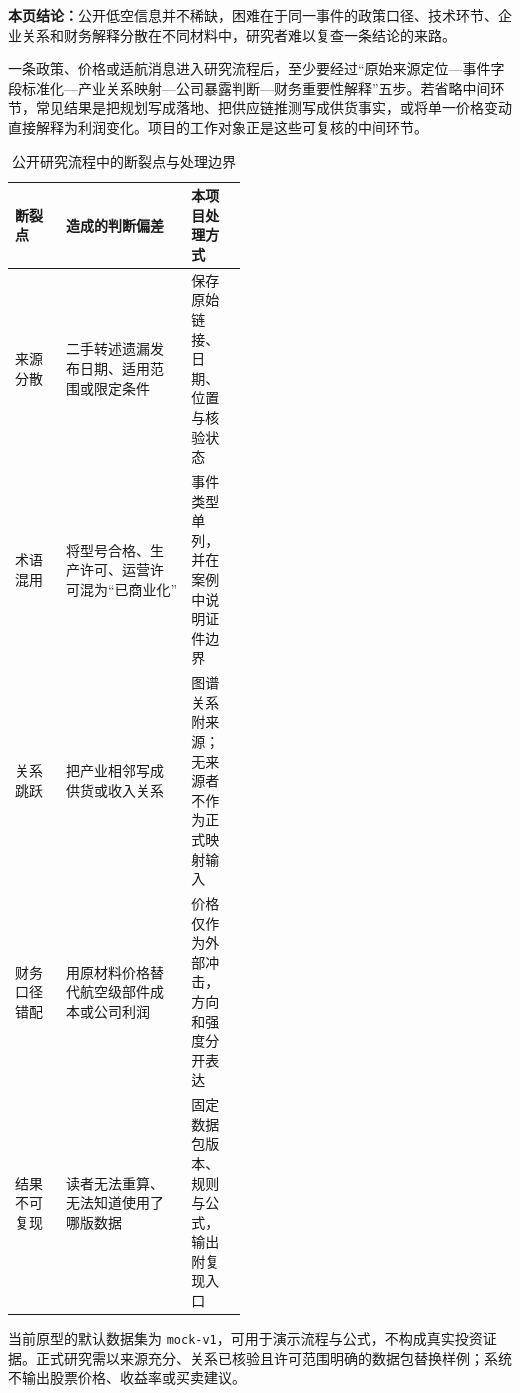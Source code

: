 
\textbf{本页结论：}公开低空信息并不稀缺，困难在于同一事件的政策口径、技术环节、企业关系和财务解释分散在不同材料中，研究者难以复查一条结论的来路。

一条政策、价格或适航消息进入研究流程后，至少要经过“原始来源定位—事件字段标准化—产业关系映射—公司暴露判断—财务重要性解释”五步。若省略中间环节，常见结果是把规划写成落地、把供应链推测写成供货事实，或将单一价格变动直接解释为利润变化。项目的工作对象正是这些可复核的中间环节。

\begin{table}[htbp]
\centering
\caption{公开研究流程中的断裂点与处理边界}
\label{tab:wty-research-breaks}
\small
\begin{tabularx}{\linewidth}{p{0.22\linewidth}X p{0.24\linewidth}}
\toprule
断裂点 & 造成的判断偏差 & 本项目处理方式 \\
\midrule
来源分散 & 二手转述遗漏发布日期、适用范围或限定条件 & 保存原始链接、日期、位置与核验状态 \\
术语混用 & 将型号合格、生产许可、运营许可混为“已商业化” & 事件类型单列，并在案例中说明证件边界 \\
关系跳跃 & 把产业相邻写成供货或收入关系 & 图谱关系附来源；无来源者不作为正式映射输入 \\
财务口径错配 & 用原材料价格替代航空级部件成本或公司利润 & 价格仅作为外部冲击，方向和强度分开表达 \\
结果不可复现 & 读者无法重算、无法知道使用了哪版数据 & 固定数据包版本、规则与公式，输出附复现入口 \\
\bottomrule
\end{tabularx}
\end{table}

当前原型的默认数据集为 \texttt{mock-v1}，可用于演示流程与公式，不构成真实投资证据。正式研究需以来源充分、关系已核验且许可范围明确的数据包替换样例；系统不输出股票价格、收益率或买卖建议。
